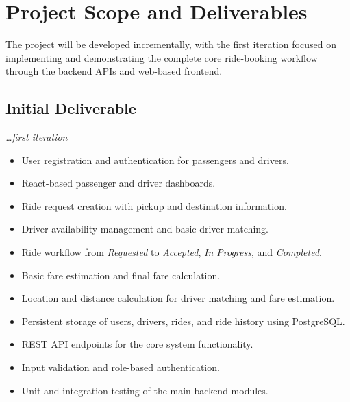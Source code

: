 \documentclass[11pt,a4paper]{article}
\newcommand{\BvrHint}[1]{%
  {\normalfont\normalsize\itshape\hfill #1}}
\begin{document}
\section{Project Scope and Deliverables}

The project will be developed incrementally, with the first iteration
focused on implementing and demonstrating the complete core
ride-booking workflow through the backend APIs and web-based
frontend.

\subsection{Initial Deliverable}
\BvrHint{\ldots first iteration}

\begin{itemize}

    \item User registration and authentication for passengers and
    drivers.

    \item React-based passenger and driver dashboards.

    \item Ride request creation with pickup and destination
    information.

    \item Driver availability management and basic driver matching.

    \item Ride workflow from \textit{Requested} to
    \textit{Accepted}, \textit{In Progress}, and
    \textit{Completed}.

    \item Basic fare estimation and final fare calculation.

    \item Location and distance calculation for driver matching and
    fare estimation.

    \item Persistent storage of users, drivers, rides, and ride
    history using PostgreSQL.

    \item REST API endpoints for the core system functionality.

    \item Input validation and role-based authentication.

    \item Unit and integration testing of the main backend modules.

\end{itemize}
\end{document}
